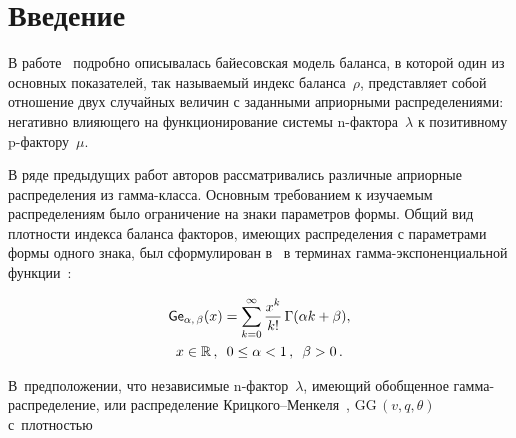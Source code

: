 


\vspace*{-6pt}



\thispagestyle{headings}

\begin{multicols}{2}

\label{st\stat}

\section{Введение}


В работе~\cite{Ku2018} подробно описывалась байесовская модель баланса, в которой один из 
основных показателей, так называемый индекс баланса~$\rho$, представляет собой отношение двух 
случайных величин с заданными априорными распределениями: негативно влияющего на функционирование 
системы n-фак\-то\-ра~$\lambda$ к позитивному p-фак\-то\-ру~$\mu$.

В ряде предыдущих работ авторов рассматривались различные априорные распределения из гам\-ма-клас\-са. 
Основным требованием к изучаемым распределениям было ограничение на знаки параметров формы.
 Общий вид плотности индекса баланса факторов, имеющих распределения с параметрами формы одного 
 знака, был сформулирован в~\cite{Ku2019_1} в терминах гам\-ма-экс\-по\-нен\-ци\-аль\-ной 
 функции~\cite{KuTi2017}:
 
 \vspace*{-6pt}
 
 \noindent
\begin{multline*}
{\sf Ge}_{\alpha,\, \beta} (x) = \sum\limits_{k=0}^{\infty}
\displaystyle\frac{\displaystyle x^k\mathstrut}{\displaystyle k!\mathstrut}\, \Gamma(\alpha k + \beta), \\
 x\in\mathbb{R}\,, \enskip  0\le\alpha<1\,, \enskip  \beta> 0\,.
\end{multline*}

\vspace*{-4pt}

\noindent
В~предположении, что независимые n-фак\-тор~$\lambda$, имеющий обобщенное гам\-ма-рас\-пре\-де\-ле\-ние, 
или распределение Криц\-ко\-го--Мен\-ке\-ля~\cite{KrMe1946,KrMe1948}, $\mathrm{GG}\,(v,q,\theta)$ с~плот\-ностью


\end{multicols}
